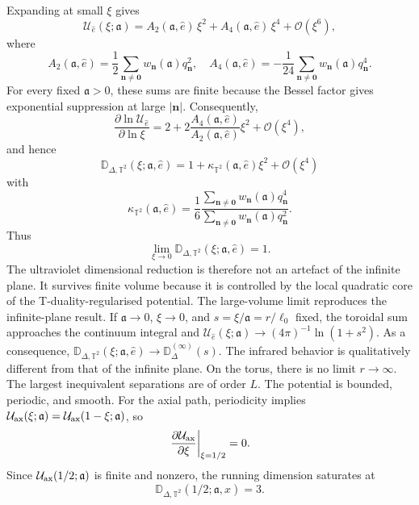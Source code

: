 \documentclass[nopacs,amsmath,amsfonts,amssymb,aps,superscriptaddress]{revtex4}
\begin{document}
Expanding at small $\xi$ gives
\begin{equation}\label{smallxi}
  \mathcal U_{\hat e}(\xi;\mathfrak{a})=A_2(\mathfrak{a},\hat e)\,\xi^2+A_4(\mathfrak{a},\hat e)\,\xi^4+\mathcal{O}(\xi^6),
\end{equation}
where
\begin{equation}
  A_2(\mathfrak{a},\hat e)=\frac{1}{2}\sum_{\mathbf n\neq\mathbf 0} w_{\mathbf n}(\mathfrak{a})q_{\mathbf n}^2,\quad  A_4(\mathfrak{a},\hat e)=-\frac{1}{24}\sum_{\mathbf n\neq\mathbf 0}w_{\mathbf n}(\mathfrak{a})q_{\mathbf n}^4.
\end{equation}
For every fixed $\mathfrak{a} > 0$, these sums are finite because the Bessel factor gives exponential suppression at large $|\mathbf n|$. Consequently,
\begin{equation}
  \frac{\partial\ln\mathcal U_{\hat e}}{\partial\ln\xi}=2+2\frac{A_4(\mathfrak{a},\hat e)}{A_2(\mathfrak{a},\hat e)}\xi^2+\mathcal{O}(\xi^4),
\end{equation}
and hence
\begin{equation}
  \mathbb D_{\Delta,\mathbb T^2}(\xi;\mathfrak{a},\hat e)=1+\kappa_{\mathbb T^2}(\mathfrak{a},\hat e)\xi^2+\mathcal{O}(\xi^4)
\end{equation}
with
\begin{equation}
  \kappa_{\mathbb T^2}(\mathfrak{a},\hat e)=\frac{1}{6}\frac{\displaystyle\sum_{\mathbf n\neq\mathbf 0}w_{\mathbf n}(\mathfrak{a})q_{\mathbf n}^4}{\displaystyle\sum_{\mathbf n\neq\mathbf 0}w_{\mathbf n}(\mathfrak{a})q_{\mathbf n}^2}.
\end{equation}
Thus
\begin{equation}
  \lim_{\xi\to 0}\mathbb D_{\Delta,\mathbb T^2}(\xi;\mathfrak{a},\hat e)=1. 
\end{equation}
The ultraviolet dimensional reduction is therefore not an artefact of the infinite plane. It survives finite volume because it is controlled by the local quadratic core of the T-duality-regularised potential. The large-volume limit reproduces the infinite-plane result. If $\mathfrak{a}\to 0$, $\xi\to 0$, and $s=\xi/\mathfrak{a}=r/\ell_0$ fixed, the toroidal sum approaches the continuum integral and $\mathcal U_{\hat e}(\xi;\mathfrak{a})\longrightarrow(4\pi)^{-1}\ln(1+s^2)$. As a consequence, $\mathbb D_{\Delta,\mathbb T^2}(\xi;\mathfrak{a},\hat e)\longrightarrow\mathbb D_\Delta^{(\infty)}(s)$. The infrared behavior is qualitatively different from that of the infinite plane. On the torus, there is no limit $r\to\infty$. The largest inequivalent separations are of order $L$. The potential is bounded, periodic, and smooth. For the axial path, periodicity implies $\mathcal U_{\rm ax}(\xi;\mathfrak{a})=\mathcal U_{\rm ax}(1-\xi;\mathfrak{a})$, so
\begin{equation}
  \left.\frac{\partial\mathcal U_{\rm ax}}{\partial\xi}\right|_{\xi=1/2}=0.
\end{equation}
Since $\mathcal U_{\rm ax}(1/2;\mathfrak{a})$ is finite and nonzero, the running dimension saturates at
\begin{equation}
  \mathbb D_{\Delta,\mathbb T^2}(1/2;\mathfrak{a},\hat x)=3.
\end{equation}
\end{document}
